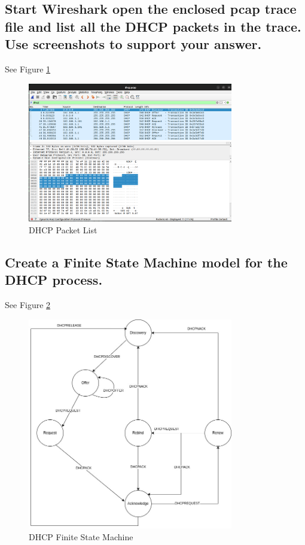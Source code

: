 \documentclass{article}
\begin{document}
\subsection{Start Wireshark open the enclosed pcap trace file and list all the DHCP packets in the trace. Use
screenshots to support your answer.}

See Figure \ref{fig:pcap_dhcp}

\begin{figure}[h]
    \centering
    \includegraphics[width=0.8\textwidth]{task2/dhcp_wireshark.png}
    \caption{DHCP Packet List}
    \label{fig:pcap_dhcp}
\end{figure}

\subsection{Create a Finite State Machine model for the DHCP process.}
 
See Figure \ref{fig:dhcp_fsm}

\begin{figure}[h]
    \centering
    \includegraphics[width=0.8\textwidth]{task2/DHCP_FSM.jpg}
    \caption{DHCP Finite State Machine}
    \label{fig:dhcp_fsm}
\end{figure}
\end{document}
